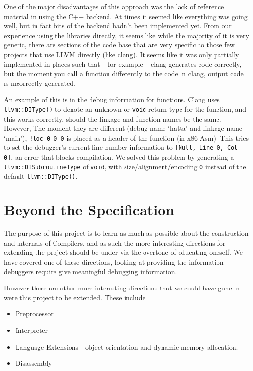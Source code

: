 \documentclass[a4wide, 11pt]{article}
\begin{document}
One of the major disadvantages of this approach was the lack of reference material in using the C++ backend. At times it seemed like everything was going well, but in fact bits of the backend hadn't been implemented yet. From our experience using the libraries directly, it seems like while the majority of it is very generic, there are sections of the code base that are very specific to those few projects that use LLVM directly (like clang). It seems like it was only partially implemented in places such that -- for example -- clang generates code correctly, but the moment you call a function differently to the code in clang, output code is incorrectly generated.

An example of this is in the debug information for functions. Clang uses \texttt{llvm::DIType()} to denote an unknown or \texttt{void} return type for the function, and this works correctly, should the linkage and function names be the same. However, The moment they are different (debug name `hatta' and linkage name `main'), \texttt{!loc 0 0 0} is placed as a header of the function (in x86 Asm). This tries to set the debugger's current line number information to \texttt{[Null, Line 0, Col 0]}, an error that blocks compilation. We solved this problem by generating a \texttt{llvm::DISubroutineType} of \texttt{void}, with size/alignment/encoding \texttt{0} instead of the default \texttt{llvm::DIType()}. 

\section{Beyond the Specification}

The purpose of this project is to learn as much as possible about the construction and internals of Compilers, and as such the more interesting directions for extending the project should be under via the overtone of educating oneself. We have covered one of these directions, looking at providing the information debuggers require give meaningful debugging information. 

However there are other more interesting directions that we could have gone in were this project to be extended. These include
\begin{itemize}
\item Preprocessor
\item Interpreter
\item Language Extensions - object-orientation and dynamic memory allocation.
\item Disassembly
\end{itemize}
\end{document}
